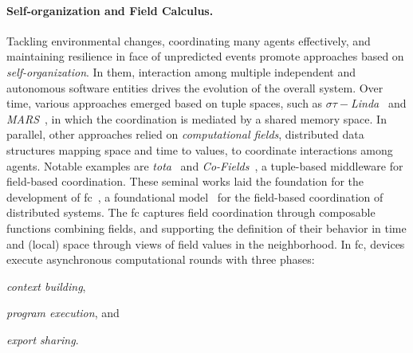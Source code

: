 \documentclass[12pt, a4paper]{article}
\newenvironment{inlinelist}{\begin{enumerate*}[label=\emph{(\roman*)}]}{\end{enumerate*}}
\begin{document}
\sloppypar
\paragraph{Self-organization and Field Calculus.}

Tackling environmental changes, coordinating many agents effectively, and maintaining resilience
in face of unpredicted events promote approaches based on \emph{self-organization}.
%
In them,
interaction among multiple independent and autonomous software entities drives the evolution of the overall system.
%
Over time,
various approaches emerged based on tuple spaces,
such as \textit{$\sigma\tau-$Linda}~\cite{ViroliCoordination2012} and \textit{MARS}~\cite{mars},
in which the coordination is mediated by a shared memory space.
%
In parallel,
other approaches relied on \emph{computational fields},
distributed data structures mapping space and time to values,
to coordinate interactions among agents.
%
Notable examples are \emph{\ac{tota}}~\cite{tota} and \emph{Co-Fields}~\cite{MameiZL04},
a tuple-based middleware for field-based coordination.
%
These seminal works laid the foundation for the development of \ac{fc}~\cite{JLAMP2019},
a foundational model~\cite{TOCL2019} for the field-based coordination of distributed systems.
%
The \ac{fc} captures field coordination through composable functions
combining fields, and supporting the definition of their behavior in time
and (local) space through views of field values in the neighborhood.
%
%
In \ac{fc}, devices execute asynchronous computational rounds with three phases:
\begin{inlinelist}
    \item \emph{context building},
    \item \emph{program execution}, and
    \item \emph{export sharing}.
\end{inlinelist}
%

\sloppypar
\end{document}
